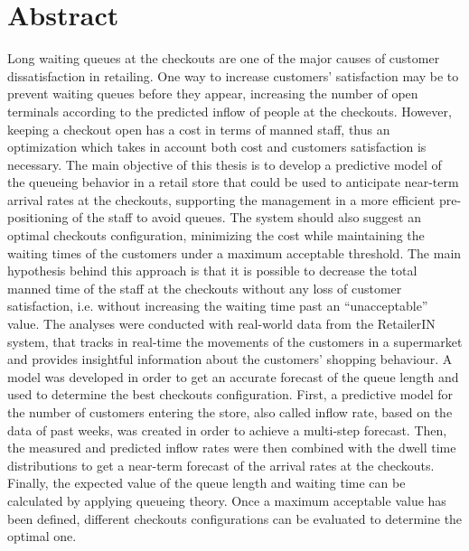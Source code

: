 \chapter*{Abstract}
\label{abstract}


Long waiting queues at the checkouts are one of the major causes of customer dissatisfaction in retailing. One way to increase customers' satisfaction may be to prevent waiting queues before they appear, increasing the number of open terminals according to the predicted inflow of people at the checkouts. However, keeping a checkout open has a cost in terms of manned staff, thus an optimization which takes in account both cost and customers satisfaction is necessary.
The main objective of this thesis is to develop a predictive model of the queueing behavior in a retail store that could be used to anticipate near-term arrival rates at the checkouts, supporting the management in a more efficient pre-positioning of the staff to avoid queues. The system should also suggest an optimal checkouts configuration, minimizing the cost while maintaining the waiting times of the customers under a maximum acceptable threshold. The main hypothesis behind this approach is that it is possible to decrease the total manned time of the staff at the checkouts without any loss of customer satisfaction, i.e. without increasing the waiting time past an “unacceptable” value.
The analyses were conducted with real-world data from the RetailerIN system, that tracks in real-time the movements of the customers in a supermarket and provides insightful information about the customers’ shopping behaviour.
A model was developed in order to get an accurate forecast of the queue length and used to determine the best checkouts configuration. First, a predictive model for the number of customers entering the store, also called inflow rate, based on the data of past weeks, was created in order to achieve a multi-step forecast. Then, the measured and predicted inflow rates were then combined with the dwell time distributions to get a near-term forecast of the arrival rates at the checkouts. Finally, the expected value of the queue length and waiting time can be calculated by applying queueing theory. Once a maximum acceptable value has been defined, different checkouts configurations can be evaluated to determine the optimal one.

\clearpage



